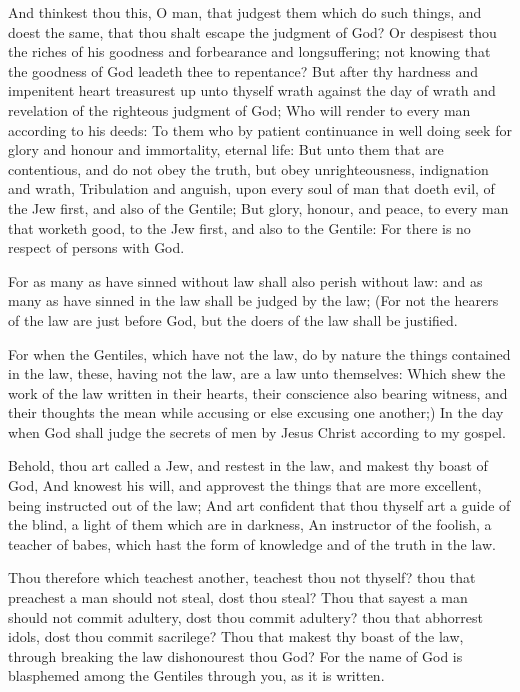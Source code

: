 \Verse And thinkest thou this, O man, that judgest them which do such things, and doest the same, that thou shalt escape the judgment of God?  \Verse Or despisest thou the riches of his goodness and forbearance and longsuffering; not knowing that the goodness of God leadeth thee to repentance?  \Verse But after thy hardness and impenitent heart treasurest up unto thyself wrath against the day of wrath and revelation of the righteous judgment of God; \Verse Who will render to every man according to his deeds: \Verse To them who by patient continuance in well doing seek for glory and honour and immortality, eternal life: \Verse But unto them that are contentious, and do not obey the truth, but obey unrighteousness, indignation and wrath, \Verse Tribulation and anguish, upon every soul of man that doeth evil, of the Jew first, and also of the Gentile; \Verse But glory, honour, and peace, to every man that worketh good, to the Jew first, and also to the Gentile: \Verse For there is no respect of persons with God.

\Verse For as many as have sinned without law shall also perish without law: and as many as have sinned in the law shall be judged by the law; \Verse (For not the hearers of the law are just before God, but the doers of the law shall be justified.

\Verse For when the Gentiles, which have not the law, do by nature the things contained in the law, these, having not the law, are a law unto themselves: \Verse Which shew the work of the law written in their hearts, their conscience also bearing witness, and their thoughts the mean while accusing or else excusing one another;) \Verse In the day when God shall judge the secrets of men by Jesus Christ according to my gospel.

\Verse Behold, thou art called a Jew, and restest in the law, and makest thy boast of God, \Verse And knowest his will, and approvest the things that are more excellent, being instructed out of the law; \Verse And art confident that thou thyself art a guide of the blind, a light of them which are in darkness, \Verse An instructor of the foolish, a teacher of babes, which hast the form of knowledge and of the truth in the law.

\Verse Thou therefore which teachest another, teachest thou not thyself?  thou that preachest a man should not steal, dost thou steal?  \Verse Thou that sayest a man should not commit adultery, dost thou commit adultery? thou that abhorrest idols, dost thou commit sacrilege?  \Verse Thou that makest thy boast of the law, through breaking the law dishonourest thou God?  \Verse For the name of God is blasphemed among the Gentiles through you, as it is written.


